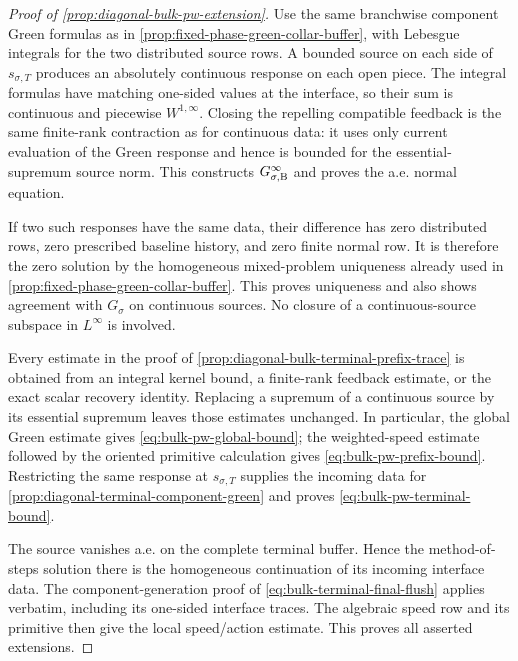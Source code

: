 \begin{proof}[Proof of
\cref{prop:diagonal-bulk-pw-extension}]
Use the same branchwise component Green formulas as in
\cref{prop:fixed-phase-green-collar-buffer}, with Lebesgue integrals for
the two distributed source rows.  A bounded source on each side of
\(s_{\sigma,T}\) produces an absolutely continuous response on each open
piece.  The integral formulas have matching one-sided values at the
interface, so their sum is continuous and piecewise \(W^{1,\infty}\).
Closing the repelling compatible feedback is the same finite-rank
contraction as for continuous data: it uses only current evaluation of the
Green response and hence is bounded for the essential-supremum source norm.
This constructs \(G_{\sigma,\rm B}^{\infty}\) and proves the a.e. normal
equation.

If two such responses have the same data, their difference has zero
distributed rows, zero prescribed baseline history, and zero finite normal
row.  It is therefore the zero solution by the homogeneous mixed-problem
uniqueness already used in
\cref{prop:fixed-phase-green-collar-buffer}.  This proves uniqueness and
also shows agreement with \(G_\sigma\) on continuous sources.  No closure
of a continuous-source subspace in \(L^\infty\) is involved.

Every estimate in the proof of
\cref{prop:diagonal-bulk-terminal-prefix-trace} is obtained from an
integral kernel bound, a finite-rank feedback estimate, or the exact
scalar recovery identity.  Replacing a supremum of a continuous source by
its essential supremum leaves those estimates unchanged.  In particular,
the global Green estimate gives
\cref{eq:bulk-pw-global-bound}; the weighted-speed estimate followed by
the oriented primitive calculation gives
\cref{eq:bulk-pw-prefix-bound}.  Restricting the same response at
\(s_{\sigma,T}\) supplies the incoming data for
\cref{prop:diagonal-terminal-component-green} and proves
\cref{eq:bulk-pw-terminal-bound}.

The source vanishes a.e. on the complete terminal buffer.  Hence the
method-of-steps solution there is the homogeneous continuation of its
incoming interface data.  The component-generation proof of
\cref{eq:bulk-terminal-final-flush} applies verbatim, including its
one-sided interface traces.  The algebraic speed row and its primitive
then give the local speed/action estimate.  This proves all asserted
extensions.
\end{proof}

